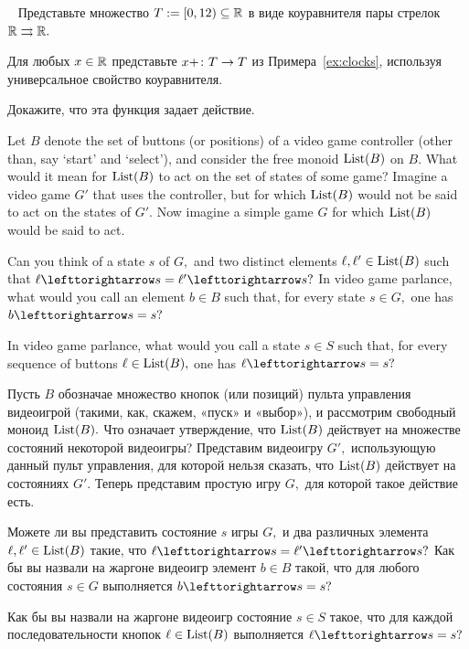 \documentclass[CT4S-EN-RU]{subfiles}
\begin{document}
\begin{exerciseRUS}\label{exc:clock}~
\sexc Представьте множество $T:=[0,12)\subseteq{\mathbb R}$ в виде коуравнителя пары стрелок ${\mathbb R}\rightrightarrows{\mathbb R}.$
\item Для любых $x\in{\mathbb R}$ представьте $x+ \colon T\rightarrow T$ из Примера~\ref{ex:clocks}, используя универсальное свойство коуравнителя.
\item Докажите, что эта функция задает действие.
\endsexc
\end{exerciseRUS}

\begin{exerciseENG}
Let $B$ denote the set of buttons (or positions) of a video game controller (other than, say `start' and `select'), and consider the free monoid $\operatorname{List}(B)$ on $B.$
\sexc What would it mean for $\operatorname{List}(B)$ to act on the set of states of some game? Imagine a video game $G'$ that uses the controller, but for which $\operatorname{List}(B)$ would not be said to act on the states of $G'.$ Now imagine a simple game $G$ for which $\operatorname{List}(B)$ would be said to act.
\item Can you think of a state $s$ of $G,$ and two distinct elements $\ell,\ell'\in\operatorname{List}(B)$ such that $\ell\acts s=\ell'\acts s?$ In video game parlance, what would you call an element $b\in B$ such that, for every state $s\in G,$ one has $b\acts s=s?$
\item In video game parlance, what would you call a state $s\in S$ such that, for every sequence of buttons $\ell\in\operatorname{List}(B),$ one has $\ell\acts s=s?$
\endsexc
\end{exerciseENG}

\begin{exerciseRUS}
Пусть $B$ обозначае множество кнопок (или позиций) пульта управления видеоигрой (такими, как, скажем, «пуск» и «выбор»), и рассмотрим свободный моноид $\operatorname{List}(B).$
\sexc Что означает утверждение, что $\operatorname{List}(B)$ действует на множестве состояний некоторой видеоигры? Представим видеоигру $G',$ использующую данный пульт управления, для которой нельзя сказать, что  $\operatorname{List}(B)$ действует на состояниях $G'.$ Теперь представим простую игру $G,$ для которой такое действие есть.
\item Можете ли вы представить состояние $s$ игры $G,$ и два различных элемента $\ell,\ell'\in\operatorname{List}(B)$ такие, что $\ell\acts s=\ell'\acts s?$ Как бы вы назвали на жаргоне видеоигр элемент $b\in B$ такой, что для любого состояния $s\in G$ выполняется $b\acts s=s?$
\item Как бы вы назвали на жаргоне видеоигр состояние $s\in S$ такое, что для каждой последовательности кнопок $\ell\in\operatorname{List}(B)$ выполняется $\ell\acts s=s?$
\endsexc
\end{exerciseRUS}
\end{document}
